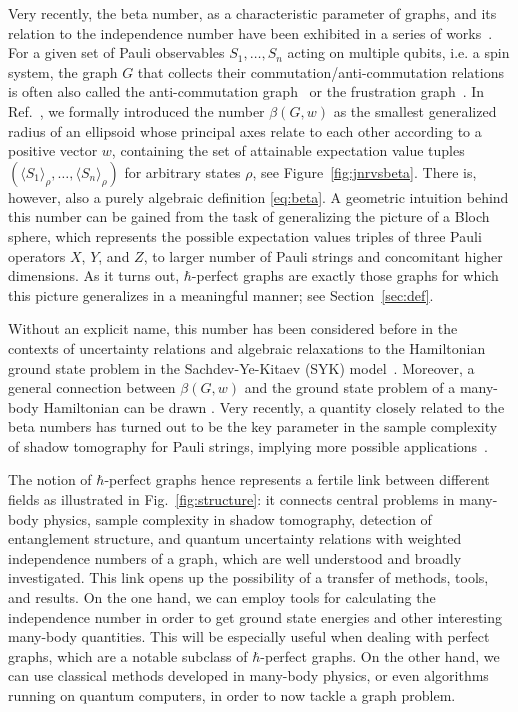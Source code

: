 \documentclass[
12pt,
prx,
aps,
reprint,
a4paper,
longbibliograph,
nofootinbib,
nobibnotes,
superscriptaddress
]{revtex4-2}
\theoremstyle{definition}
\begin{document}
Very recently, the beta number, as a characteristic parameter of graphs, and its relation to the independence number have been exhibited in a series of works~\cite{de2023uncertainty,hastings2022optimizing,xu2023bounding,moran2024Uncertainty}.
For a given set of Pauli observables ${S_1, \dots, S_n}$ acting on multiple qubits, i.e. a spin system, the graph $G$ that collects their commutation/anti-commutation relations is often also called the anti-commutation graph~\cite{gokhale2019minimizing} or the frustration graph~\cite{chapman2020characterization,chapman2023unified}. 
In Ref.~\cite{xu2023bounding}, we formally introduced the number $\beta(G,w)$ as the smallest generalized radius of an ellipsoid whose principal axes relate to each other according to a positive vector $w$, containing the set of attainable expectation value tuples $(\langle S_1 \rangle_\rho,\dots,\langle S_n \rangle_\rho)$ for arbitrary states $\rho$, see Figure~\ref{fig:jnrvsbeta}. There is, however, also a purely algebraic definition \eqref{eq:beta}.
%
A geometric intuition behind this number can be gained from the task of generalizing the picture of a Bloch sphere, which represents the possible expectation values triples of three Pauli operators $X$, $Y$, and $Z$, to larger number of Pauli strings and concomitant higher dimensions.
As it turns out, $\hbar$-perfect graphs are exactly those graphs for which this picture generalizes in a meaningful manner; see Section~\ref{sec:def}.

Without an explicit name, this number has been considered before in the contexts of 
uncertainty relations \cite{de2023uncertainty} and   algebraic relaxations to the Hamiltonian ground state problem \cite{hastings2022optimizing} in the Sachdev-Ye-Kitaev (SYK) model~\cite{sachdev1993gapless}. 
Moreover, a general connection between $\beta(G,w)$ and the ground state problem of a many-body Hamiltonian can be drawn \cite{xu2023bounding,hastings2022optimizing}.
Very recently, a quantity closely related to the beta numbers has turned out to be  the key parameter in the sample complexity of shadow tomography for Pauli strings,  implying more possible applications~\cite{king2024triplyefficientshadowtomography,chen2024Optimal}.


The notion of $\hbar$-perfect graphs hence represents a fertile link between different fields as illustrated in Fig.~\ref{fig:structure}: it connects central problems in many-body physics, sample complexity in shadow tomography, detection of entanglement structure, and quantum uncertainty relations with weighted independence numbers of a graph, which are well understood and broadly investigated. 
This link opens up the possibility of a transfer of methods, tools, and results. On the one hand, we can employ tools for calculating the independence number in order to get ground state energies and other interesting many-body quantities. This will be especially useful when dealing with perfect graphs, which are a notable subclass of $\hbar$-perfect graphs.
On the other hand, we can use classical methods developed in many-body physics, or even algorithms running on quantum computers, in order to now tackle a graph problem.  
\end{document}
